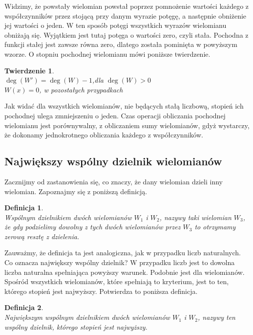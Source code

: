 \documentclass[oneside,a4paper]{book}
\newtheorem{theorem}{Twierdzenie}
\newtheorem{definition}{Definicja}
\begin{document}
	Widzimy, że powstały wielomian powstał poprzez pomnożenie wartości każdego z współczynników przez stojącą przy danym wyrazie potęgę, a następnie obniżenie jej wartości o jeden. W ten sposób potęgi wszystkich wyrazów wielomianu obniżają się. Wyjątkiem jest tutaj potęga o wartości zero, czyli stała. Pochodna z funkcji stałej jest zawsze równa zero, dlatego została pominięta w powyższym wzorze. O stopniu pochodnej wielomianu mówi poniższe twierdzenie.
	
	\begin{theorem}
		$ $\\
		$\deg(W') = \deg(W) - 1$,dla $\deg(W) > 0$ \\
		$W(x) = 0$, w pozostałych przypadkach
	\end{theorem}
	
	Jak widać dla wszystkich wielomianów, nie będących stałą liczbową, stopień ich pochodnej ulega zmniejszeniu o jeden. Czas operacji obliczania pochodnej wielomianu jest porównywalny, z obliczaniem sumy wielomianów, gdyż wystarczy, że dokonamy jednokrotnego obliczania każdego z współczynników.
	
	\subsection{Największy wspólny dzielnik wielomianów}
	
	Zacznijmy od zastanowienia się, co znaczy, że dany wielomian dzieli inny wielomian. Zapoznajmy się z poniższą definicją.
	
	\begin{definition}
		$ $\\
		Wspólnym dzielnikiem dwóch wielomianów $W_1$ i $W_2$, nazywy taki wielomian $W_3$, że gdy podzielimy dowolny z tych dwóch wielomianów przez $W_3$ to otrzymamy zerową resztę z dzielenia.
	\end{definition}
	
	Zauważmy, że definicja ta jest analogiczna, jak w przypadku liczb naturalnych.
	Co oznacza największy wspólny dzielnik? W przypadku liczb jest to dowolna liczba naturalna spełniająca powyższy warunek. Podobnie jest dla wielomianów. Spośród wszystkich wielomianów, które spełniają to kryterium, jest to ten, którego stopień jest najwyższy. Potwierdza to poniższa definicja.
	
	\begin{definition}
		$ $\\
		Największym wspólnym dzielnikiem dwóch wielomianów $W_1$ i $W_2$, nazywy ten wspólny dzielnik, którego stopień jest najwyższy.
	\end{definition}
	
\end{document}
